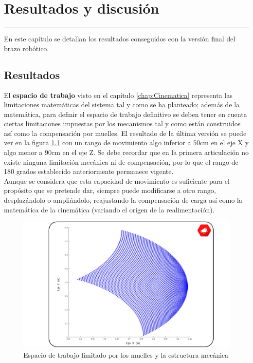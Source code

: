 \chapter{Resultados y discusión} \label{chap:Resultados}
\hrule
\vspace{3mm}

En este capítulo se detallan los resultados conseguidos con la versión final del brazo robótico.


\section{Resultados}
	
	El \textbf{espacio de trabajo} visto en el capítulo \ref{chap:Cinematica} representa las limitaciones matemáticas del sistema tal y como se ha planteado; además de la matemática, para definir el espacio de trabajo definitivo se deben tener en cuenta ciertas limitaciones impuestas por los mecanismos tal y como están construidos así como la compensación por muelles. El resultado de la última versión se puede ver en la figura \ref{fig:Resultados:workspace} con un rango de movimiento algo inferior a 50cm en el eje X y algo menor a 90cm en el eje Z. Se debe recordar que en la primera articulación no existe ninguna limitación mecánica ni de compensación, por lo que el rango de 180 grados establecido anteriormente permanece vigente.
	\\
	
	Aunque se considera que esta capacidad de movimiento es suficiente para el propósito que se pretende dar, siempre puede modificarse a otro rango, desplazándolo o ampliándolo, reajustando la compensación de carga así como la matemática de la cinemática (variando el origen de la realimentación).
	
	\begin{figure}[t]
		\centering
		\includegraphics[width=1\textwidth]{figuras/Imagenes_Resultados/workspace_robot_real.jpg}
		\caption{Espacio de trabajo limitado por los muelles y la estructura mecánica}
		\label{fig:Resultados:workspace}
	\end{figure}
	
